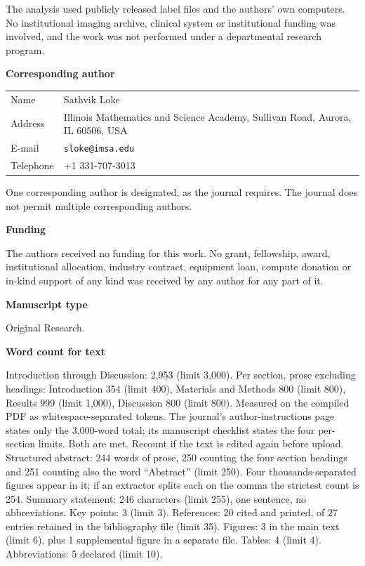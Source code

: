 \documentclass[11pt,letterpaper]{article}
\newcommand{\block}[1]{\vspace{0.5em}\textbf{#1}\par}
\begin{document}
\vspace{0.2em}
{\small The analysis used publicly released label files and the authors' own
computers. No institutional imaging archive, clinical system or institutional
funding was involved, and the work was not performed under a departmental
research program.}

\block{Corresponding author}

\begin{tabular}{@{}p{}p{}@{}}
Name & Sathvik Loke\\[0.25em]
Address & Illinois Mathematics and Science Academy,\newline
1500 Sullivan Road, Aurora, IL 60506, USA\\[0.25em]
E-mail & \texttt{sloke@imsa.edu}\\[0.25em]
Telephone & $+$1 331-707-3013\\
\end{tabular}

\vspace{0.2em}
{\small One corresponding author is designated, as the journal requires. The
journal does not permit multiple corresponding authors.}

\block{Funding}

The authors received no funding for this work. No grant, fellowship, award,
institutional allocation, industry contract, equipment loan, compute donation
or in-kind support of any kind was received by any author for any part of it.

\block{Manuscript type}

Original Research.

\block{Word count for text}

Introduction through Discussion: 2{,}953 (limit 3{,}000). Per section, prose
excluding headings: Introduction 354 (limit 400), Materials and Methods 800
(limit 800), Results 999 (limit 1{,}000), Discussion 800 (limit 800). Measured on
the compiled PDF as whitespace-separated tokens. The journal's
author-instructions page states only the 3{,}000-word total; its manuscript
checklist states the four per-section limits. Both are met. Recount if the text
is edited again before upload.
\vspace{0.2em}
{\small Structured abstract: 244 words of prose, 250 counting the four section
headings and 251 counting also the word ``Abstract'' (limit 250). Four
thousands-separated figures appear in it; if an extractor splits each on the
comma the strictest count is 254. Summary statement: 246
characters (limit 255), one sentence, no abbreviations. Key points: 3 (limit 3).
References: 20 cited and printed, of 27 entries retained in the bibliography file
(limit 35). Figures: 3 in the main text (limit 6), plus 1 supplemental figure in
a separate file. Tables: 4 (limit 4).
Abbreviations: 5 declared (limit 10).}
\end{document}
